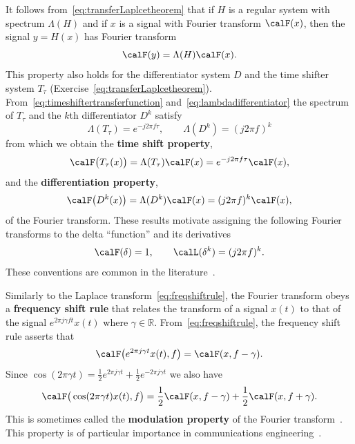 \documentclass[11pt,a4paper]{book}
\theoremstyle{plain}
\numberwithin{equation}{section}
\newcommand{\reals}{{\mathbb R}}
\newcommand{\term}{\textbf}
\begin{document}
It follows from~\eqref{eq:transferLaplcetheorem} that if $H$ is a regular system with spectrum $\Lambda(H)$ and if $x$ is a signal with Fourier transform $\calF(x)$, then the signal $y = H(x)$ has Fourier transform
\[
\calF(y) = \Lambda(H) \calF(x).
\]
This property also holds for the differentiator system $D$ and the time shifter system $T_\tau$ (Exercise~\ref{eq:transferLaplcetheorem}).  From~\eqref{eq:timeshiftertransferfunction} and~\eqref{eq:lambdadifferentiator} the spectrum of $T_\tau$ and the $k$th differentiator $D^k$ satisfy 
\[
\Lambda(T_\tau) = e^{-j2\pi f \tau}, \qquad \Lambda(D^k) = (j2\pi f)^k
\]
from which we obtain the \term{time shift property},
 \[
 \calF\big(T_\tau(x)\big) = \Lambda(T_\tau) \calF(x) = e^{-j2\pi f \tau} \calF(x),
\]
and the \term{differentiation property},
\[
 \calF\big(D^k(x)\big) = \Lambda(D^k) \calF(x) =  (j2\pi f)^k \calF(x),
\]
of the Fourier transform.  These results motivate assigning the following Fourier transforms to the delta ``function'' and its derivatives
\begin{equation}\label{eqftsofdeltas}
\calF(\delta) = 1, \qquad \calL(\delta^k) = (j2\pi f)^k.
\end{equation}
These conventions are common in the literature~\citep{Oppenheiim_sigs_sys_1996}.  

Similarly to the Laplace transform~\eqref{eq:freqshiftrule}, the Fourier transform obeys a \term{frequency shift rule} that relates the transform of a signal $x(t)$ to that of the signal $e^{2\pi j \gamma f t} x(t)$ where $\gamma \in \reals$.  From~\eqref{eq:freqshiftrule}, the frequency shift rule asserts that
\begin{align}
\calF\big( e^{2\pi j \gamma t} x(t), f\big) =  \calF(x, f - \gamma). \label{eq:freqshiftrulefourier}
\end{align}
Since $\cos( 2\pi \gamma t) = \tfrac{1}{2}e^{2\pi j \gamma t} + \tfrac{1}{2}e^{-2\pi j \gamma t}$ we also have
\begin{equation}\label{eq:modulationpropertyft}
\calF\big( \cos(2\pi \gamma t) x(t), f \big) =  \frac{1}{2}\calF(x, f - \gamma) + \frac{1}{2}\calF(x, f + \gamma).
\end{equation}
This is sometimes called the \term{modulation property} of the Fourier transform~\cite[page~61]{Papoulis_signal_analysis_1977}.  This property is of particular importance in communications engineering~\citep{Proakis_digital_comms}.  %
\end{document}
